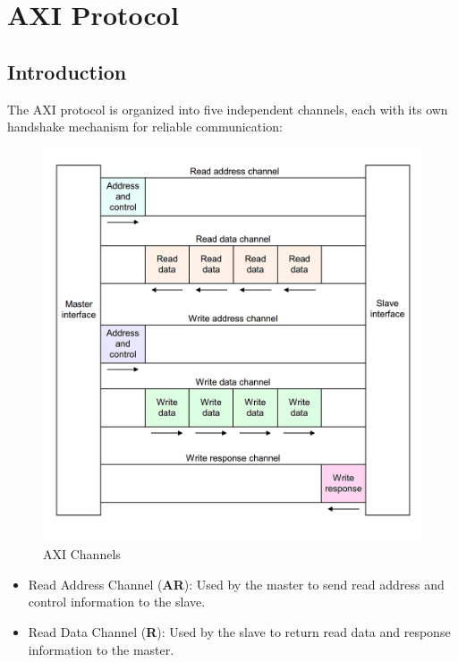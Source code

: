 \section{AXI Protocol}

\subsection{Introduction}
The AXI protocol is organized into five independent channels, each with its own handshake mechanism for reliable communication:

\begin{multicols}{2}
\begin{figure}[H]
    \centering
    \includegraphics[width=1\linewidth]{images/axi/axi_channels.png}
    \caption{AXI Channels}
\end{figure}

\begin{itemize}
    \item Read Address Channel (\textbf{AR}): Used by the master to send read address and control information to the slave.

    \item Read Data Channel (\textbf{R}): Used by the slave to return read data and response information to the master.


\end{itemize}
\end{multicols}
